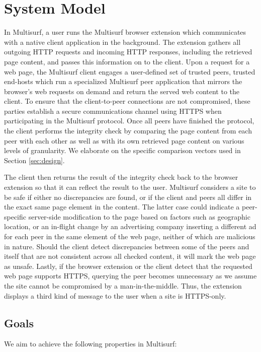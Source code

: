 \section{System Model}
\label{sec:model}

In Multisurf, a user runs the Multisurf browser extension which communicates with a native client application in the background.
The extension gathers all outgoing HTTP requests and incoming HTTP responses, including the retrieved page content, and passes this information on to the client.
Upon a request for a web page, the Multisurf client engages a user-defined set of trusted peers, trusted end-hosts which run a specialized Multisurf peer application that mirrors the browser's web requests on demand and return the served web content to the client.
To ensure that the client-to-peer connections are not compromised, these parties establish a secure communications channel using HTTPS when participating in the Multisurf protocol.
Once all peers have finished the protocol, the client performs the integrity check by comparing the page content from each peer with each other as well as with its own retrieved page content on various levels of granularity.
We elaborate on the specific comparison vectors used in Section \ref{sec:design}.

The client then returns the result of the integrity check back to the browser extension so that it can reflect the result to the user.
Multisurf considers a site to be safe if either no discrepancies are found, or if the client and peers all differ in the exact same page element in the content. 
The latter case could indicate a peer-specific server-side modification to the page based on factors such as geographic location, or an in-flight change by an advertising company inserting a different ad for each peer in the same element of the web page, neither of which are malicious in nature. 
Should the client detect discrepancies between some of the peers and itself that are not consistent across all checked content, it will mark the web page as unsafe.
Lastly, if the browser extension or the client detect that the requested web page supports HTTPS, querying the peer becomes unnecessary as we assume the site cannot be compromised by a man-in-the-middle.
Thus, the extension displays a third kind of message to the user when a site is HTTPS-only.

\subsection{Goals}
\label{sec:sec:goals}
We aim to achieve the following properties in Multisurf:

